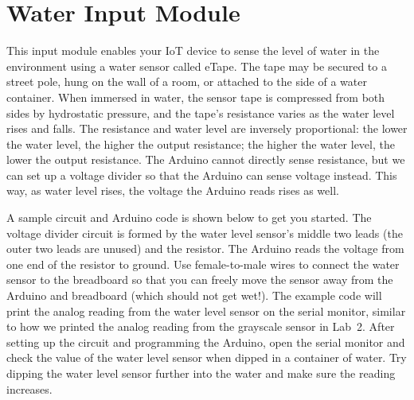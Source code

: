 
\clearpage
\section{Water Input Module}
\label{sec-input-water}

This input module enables your IoT device to sense the level of water in
the environment using a water sensor called eTape. The tape may be
secured to a street pole, hung on the wall of a room, or attached to the
side of a water container. When immersed in water, the sensor tape is
compressed from both sides by hydrostatic pressure, and the tape's
resistance varies as the water level rises and falls. The resistance and
water level are inversely proportional: the lower the water level, the
higher the output resistance; the higher the water level, the lower the
output resistance. The Arduino cannot directly sense resistance, but we
can set up a voltage divider so that the Arduino can sense voltage
instead. This way, as water level rises, the voltage the Arduino reads
rises as well.


A sample circuit and Arduino code is shown below to get you started.
The voltage divider circuit is formed by the water level sensor's middle
two leads (the outer two leads are unused) and the 
resistor. The Arduino reads the voltage from one end of the resistor to
ground. Use female-to-male wires to connect the water sensor to the
breadboard so that you can freely move the sensor away from the Arduino
and breadboard (which should not get wet!). The example code will print
the analog reading from the water level sensor on the serial monitor,
similar to how we printed the analog reading from the grayscale sensor
in Lab~2. After setting up the circuit and programming the Arduino, open
the serial monitor and check the value of the water level sensor when
dipped in a container of water. Try dipping the water level sensor
further into the water and make sure the reading increases.

